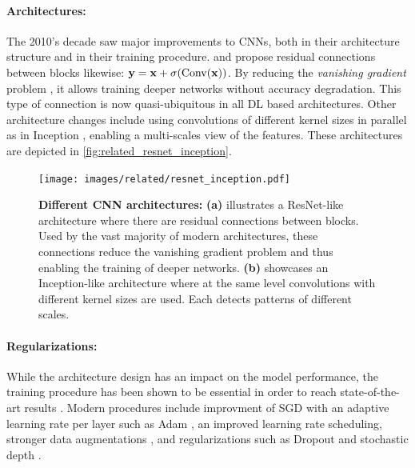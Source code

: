 \paragraph{Architectures:}The 2010's decade saw major improvements to \acp{CNN}, both in their
architecture structure and in their training procedure. \cite{srivastava2015highwaynet} and
\cite{he2016resnet} propose residual connections between blocks likewise: $\mathbf{y} = \mathbf{x} +
      \sigma(\operatorname{Conv}(\mathbf{x}))$. By reducing the \textit{vanishing gradient} problem
\citep{hochreiter2001vanishinggrad}, it allows training deeper networks without accuracy
degradation. This type of connection is now quasi-ubiquitous in all \ac{DL} based architectures.
Other architecture changes include using convolutions of different kernel sizes in parallel as in
Inception \citep{szegedy2015inception}, enabling a multi-scales view of the features. These
architectures are depicted in \autoref{fig:related_resnet_inception}.

\begin{figure}[tb]
      \begin{center}
            \texttt{[image: images/related/resnet\_inception.pdf]}
      \end{center}
      \caption{\textbf{Different CNN architectures:} \textbf{(a)} illustrates a ResNet-like
            architecture where there are residual connections between blocks. Used by the vast
            majority of modern architectures, these connections reduce the vanishing gradient problem
            and thus enabling the training of deeper networks. \textbf{(b)} showcases an Inception-like
            architecture where at the same level convolutions with different kernel sizes are used.
            Each detects patterns of different scales.}
      \label{fig:related_resnet_inception}
\end{figure}

\paragraph{Regularizations:} While the architecture design has an impact on the model performance,
the training procedure has been shown to be essential in order to reach state-of-the-art results
\citep{wightman2019resnetstrikesback}. Modern procedures include improvment of \ac{SGD} with an
adaptive learning rate per layer such as Adam \citep{kingma2014adam}, an improved learning rate
scheduling, stronger data augmentations
\citep{muller2021trivialaugment,hingyi2018mixup,zhong2017erasing}, and regularizations such as
Dropout \citep{gal2016dropout} and stochastic depth \citep{gao2016stochasticdepth}.

